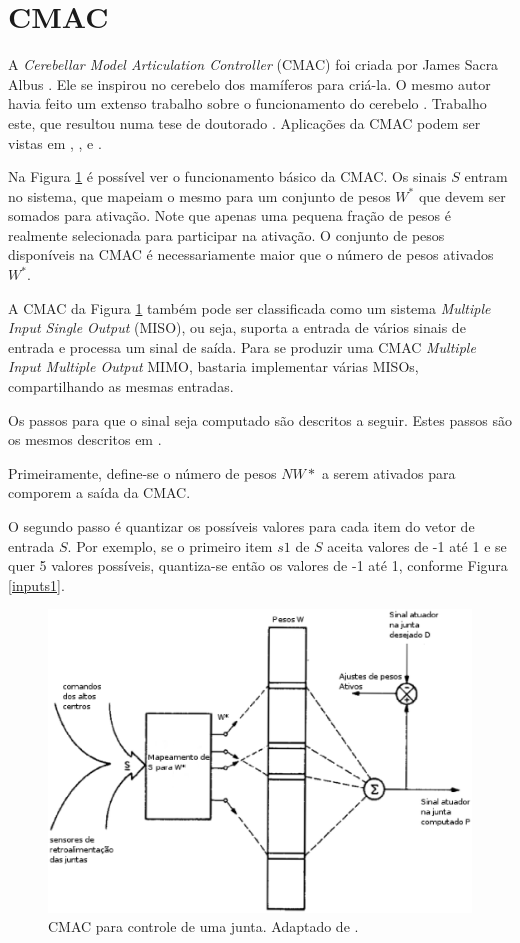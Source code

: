 \section[CMAC]{CMAC}
\label{cmac_sec}

A \emph{Cerebellar Model Articulation Controller} (CMAC) foi criada por James Sacra Albus \cite{Albus1975b}. 
Ele se inspirou no cerebelo dos mamíferos para criá-la. 
O mesmo autor havia feito um extenso trabalho sobre o funcionamento do cerebelo \cite{Albus1971b}.
Trabalho este, que resultou numa tese de doutorado \cite{Albus1972a}.
Aplicações da CMAC podem ser vistas em \cite{Albus1975d}, \cite{Albus1979}, \cite{Sabourin2006a} e \cite{Lin2002a}.

Na Figura \ref{fig1} é possível ver o funcionamento básico da CMAC. Os sinais $S$ entram no sistema, que mapeiam o mesmo para um conjunto de pesos $W^*$ que devem ser somados para ativação. 
Note que apenas uma pequena fração de pesos é realmente selecionada para participar na ativação. 
O conjunto de pesos disponíveis na CMAC é necessariamente maior que o número de pesos ativados $W^*$. 

A CMAC da Figura \ref{fig1} também pode ser classificada como um sistema \emph{Multiple Input Single Output} (MISO), ou seja, suporta a entrada de vários sinais de entrada e processa um sinal de saída.
Para se produzir uma CMAC \emph{Multiple Input Multiple Output} MIMO, bastaria implementar várias MISOs, compartilhando as mesmas entradas.


Os passos para que o sinal seja computado são descritos a seguir. Estes passos são os mesmos descritos em \cite{Albus1975b}.

Primeiramente, define-se o número de pesos $NW*$ a serem ativados para comporem a saída da CMAC.

O segundo passo é quantizar os possíveis valores para cada item do vetor de entrada $S$.
Por exemplo, se o primeiro item $s1$ de $S$ aceita valores de -1 até 1 e se quer 5 valores possíveis, quantiza-se então os valores de -1 até 1, conforme Figura \ref{inputs1}.

\begin{figure}[ht]
	\centering
	\includegraphics[width=15 cm]{figuras/cmac1.eps}
	\caption{CMAC para controle de uma junta. Adaptado de \cite{Albus1975b}.}
    	\label{fig1}
\end{figure}


